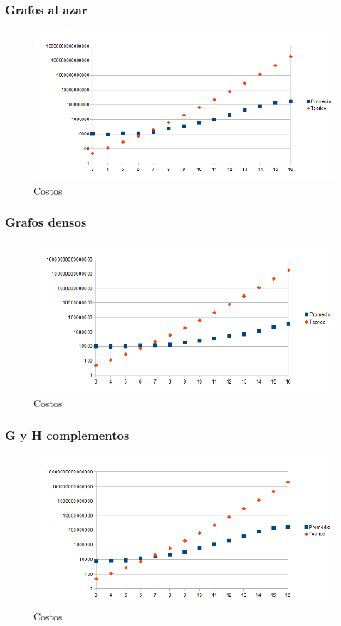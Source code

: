 \subsubsection{Grafos al azar}

\begin{figure}[H]
	\centering
	\includegraphics[scale=0.8]{exacto-tiempos-Azar.png}
\caption{Costos}
\end{figure}

\subsubsection{Grafos densos}

\begin{figure}[H]
	\centering
	\includegraphics[scale=0.8]{exacto-tiempos-G-y-H-densos.png}
\caption{Costos}
\end{figure}

\subsubsection{G y H complementos}

\begin{figure}[H]
	\centering
	\includegraphics[scale=0.8]{exacto-tiempos-H-complemento.png}
\caption{Costos}
\end{figure}